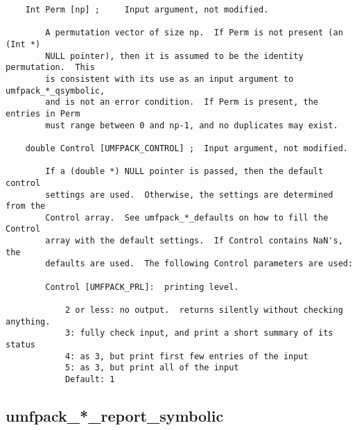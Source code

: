 {\begin{verbatim}
    Int Perm [np] ;     Input argument, not modified.

        A permutation vector of size np.  If Perm is not present (an (Int *)
        NULL pointer), then it is assumed to be the identity permutation.  This
        is consistent with its use as an input argument to umfpack_*_qsymbolic,
        and is not an error condition.  If Perm is present, the entries in Perm
        must range between 0 and np-1, and no duplicates may exist.

    double Control [UMFPACK_CONTROL] ;  Input argument, not modified.

        If a (double *) NULL pointer is passed, then the default control
        settings are used.  Otherwise, the settings are determined from the
        Control array.  See umfpack_*_defaults on how to fill the Control
        array with the default settings.  If Control contains NaN's, the
        defaults are used.  The following Control parameters are used:

        Control [UMFPACK_PRL]:  printing level.

            2 or less: no output.  returns silently without checking anything.
            3: fully check input, and print a short summary of its status
            4: as 3, but print first few entries of the input
            5: as 3, but print all of the input
            Default: 1
\end{verbatim}
}

\newpage
\subsection{umfpack\_*\_report\_symbolic}

